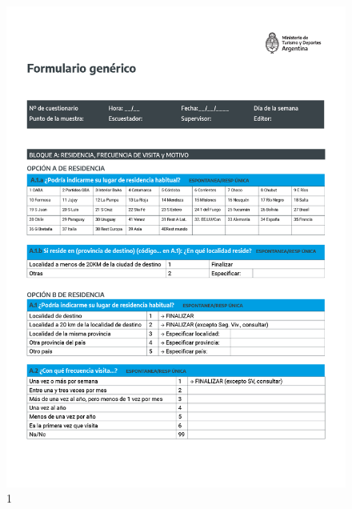 \documentclass[
]{book}
\begin{document}
\begin{figure}

{\centering \includegraphics[width=1\linewidth]{imagenes/graf01} 

}

\caption{1}\label{fig:001}
\end{figure}
\end{document}
